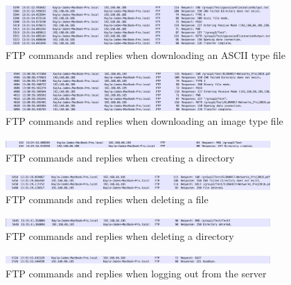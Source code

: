 \documentclass[10pt,twocolumn]{witseiepaper}
\begin{document}
\begin{appendix}
\begin{figure}[h]
	\centering
	\includegraphics[width=0.9\textwidth]{ourserverDownloadtext.png}
	\caption{FTP commands and replies when downloading an ASCII type file}
	\raggedright
	\label{fig:textdownload}	
\end{figure}

\begin{figure}[h]
	\centering
	\includegraphics[width=0.9\textwidth]{ourserverDownloadPDF.png}
	\caption{FTP commands and replies when downloading an image type file}
	\raggedright
	\label{fig:pdfdownload}	
\end{figure}

\begin{figure}[h]
	\centering
	\includegraphics[width=0.9\textwidth]{ourServerMKD.png}
	\caption{FTP commands and replies when creating a directory}
	\raggedright
	\label{fig:makeDirectory}	
\end{figure}

\begin{figure}[h]
	\centering
	\includegraphics[width=0.9\textwidth]{ourserverDeleteFile.png}
	\caption{FTP commands and replies when deleting a file}
	\raggedright
	\label{fig:delete}	
\end{figure}

\begin{figure}[h]
	\centering
	\includegraphics[width=0.9\textwidth]{ourserverdeletefolder.png}
	\caption{FTP commands and replies when deleting a directory}
	\raggedright
	\label{fig:deleteFolder}	
\end{figure}

\begin{figure}[h]
	\centering
	\includegraphics[width=0.9\textwidth]{ourserverquit.png}
	\caption{FTP commands and replies when logging out from the server}
	\raggedright
	\label{fig:logout}	
\end{figure}


\end{appendix}
\end{document}
